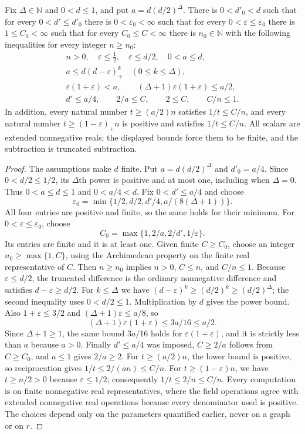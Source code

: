 \begin{lemma}
Fix $\Delta\in\mathbb N$ and $0<d\leq1$, and put $a=d(d/2)^\Delta$.
There is $0<d'_0<d$ such that for every $0<d'\leq d'_0$ there is
$0<\varepsilon_0<\infty$ such that for every
$0<\varepsilon\leq\varepsilon_0$ there is $1\leq C_0<\infty$
such that for every $C_0\leq C<\infty$ there is $n_0\in\mathbb N$
with the following inequalities for every integer $n\geq n_0$:
\[
\begin{gathered}
 n>0,\quad \varepsilon\leq\tfrac12,\quad\varepsilon\leq d/2,
 \quad 0<a\leq d,\\
 a\leq d(d-\varepsilon)_+^k\quad(0\leq k\leq\Delta),\\
 \varepsilon(1+\varepsilon)<a,\qquad
 (\Delta+1)\varepsilon(1+\varepsilon)\leq a/2,\\
 d'\leq a/4,\qquad 2/a\leq C,\qquad 2\leq C,
 \qquad C/n\leq1.
\end{gathered}
\]
In addition, every natural number $t\geq(a/2)n$ satisfies
$1/t\leq C/n$, and every natural number $t\geq(1-\varepsilon)_+n$
is positive and satisfies $1/t\leq C/n$.
All scalars are extended nonnegative reals; the displayed bounds force
them to be finite, and the subtraction is truncated subtraction.
\end{lemma}
\begin{proof}
The assumptions make $d$ finite. Put $a=d(d/2)^\Delta$ and $d'_0=a/4$.
Since $0<d/2\leq1/2$, its $\Delta$th power is positive and at most
one, including when $\Delta=0$. Thus $0<a\leq d\leq1$ and
$0<a/4<d$. Fix $0<d'\leq a/4$ and choose
\[
 \varepsilon_0=\min\{1/2,d/2,d'/4,a/(8(\Delta+1))\}.
\]
All four entries are positive and finite, so the same holds for their
minimum. For $0<\varepsilon\leq\varepsilon_0$, choose
\[
 C_0=\max\{1,2/a,2/d',1/\varepsilon\}.
\]
Its entries are finite and it is at least one. Given finite $C\geq C_0$,
choose an integer $n_0\geq\max\{1,C\}$, using the Archimedean
property on the finite real representative of $C$. Then $n\geq n_0$
implies $n>0$, $C\leq n$, and $C/n\leq1$.
Because $\varepsilon\leq d/2$, the truncated difference is the ordinary
nonnegative difference and satisfies $d-\varepsilon\geq d/2$.
For $k\leq\Delta$ we have
$(d-\varepsilon)^k\geq(d/2)^k\geq(d/2)^\Delta$; the second
inequality uses $0<d/2\leq1$. Multiplication by $d$ gives the power
bound. Also $1+\varepsilon\leq3/2$ and
$(\Delta+1)\varepsilon\leq a/8$, so
\[
 (\Delta+1)\varepsilon(1+\varepsilon)\leq3a/16\leq a/2.
\]
Since $\Delta+1\geq1$, the same bound $3a/16$ holds for
$\varepsilon(1+\varepsilon)$, and it is strictly less than $a$
because $a>0$. Finally $d'\leq a/4$ was imposed, $C\geq2/a$ follows
from $C\geq C_0$, and $a\leq1$ gives $2/a\geq2$.
For $t\geq(a/2)n$, the lower bound is positive, so reciprocation gives
$1/t\leq2/(an)\leq C/n$. For $t\geq(1-\varepsilon)n$, we have
$t\geq n/2>0$ because $\varepsilon\leq1/2$; consequently
$1/t\leq2/n\leq C/n$.
Every computation is on finite nonnegative real representatives, where
the field operations agree with extended nonnegative real operations
because every denominator used is positive. The choices depend only
on the parameters quantified earlier, never on a graph or on $r$.
\end{proof}
